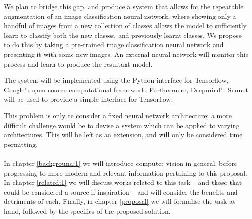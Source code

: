 \documentclass{report}
\begin{document}
	We plan to bridge this gap, and produce a system that allows for the repeatable augmentation of an image classification neural network, where showing only a handful of images from a new collection of classes allows the model to sufficiently learn to classify both the new classes, and previously learnt classes. We propose to do this by taking a pre-trained image classification neural network and presenting it with some new images. An external neural network will monitor this process and learn to produce the resultant model. \par
	The system will be implemented using the Python interface for Tensorflow\parencite{tensorflow}, Google's open-source computational framework. Furthermore, Deepmind's Sonnet\parencite{sonnet} will be used to provide a simple interface for Tensorflow. \par
	This problem is only to consider a fixed neural network architecture; a more difficult challenge would be to devise a system which can be applied to varying architectures. This will be left as an extension, and will only be considered time permitting. \\ \\
	In chapter \ref{background:1} we will introduce computer vision in general, before progressing to more modern and relevant information pertaining to this proposal. In chapter \ref{related:1} we will discuss works related to this task -- and those that could be considered a source if inspiration -- and will consider the benefits and detriments of each. Finally, in chapter \ref{proposal} we will formalise the task at hand, followed by the specifics of the proposed solution. \par
	
	
\end{document}
